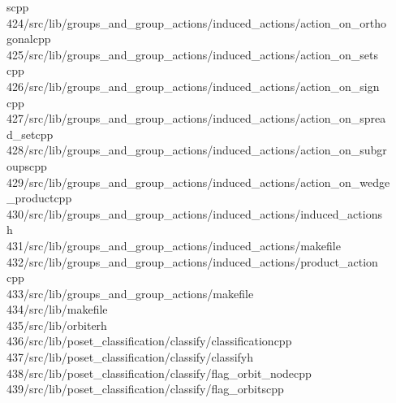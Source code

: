 \begin{tabbing}
\>scpp\\[0pt]
424\>/src/lib/groups\_and\_group\_actions/induced\_actions/action\_on\_ortho\\[0pt]
\>gonalcpp\\[0pt]
425\>/src/lib/groups\_and\_group\_actions/induced\_actions/action\_on\_sets\\[0pt]
\>cpp\\[0pt]
426\>/src/lib/groups\_and\_group\_actions/induced\_actions/action\_on\_sign\\[0pt]
\>cpp\\[0pt]
427\>/src/lib/groups\_and\_group\_actions/induced\_actions/action\_on\_sprea\\[0pt]
\>d\_setcpp\\[0pt]
428\>/src/lib/groups\_and\_group\_actions/induced\_actions/action\_on\_subgr\\[0pt]
\>oupscpp\\[0pt]
429\>/src/lib/groups\_and\_group\_actions/induced\_actions/action\_on\_wedge\\[0pt]
\>\_productcpp\\[0pt]
430\>/src/lib/groups\_and\_group\_actions/induced\_actions/induced\_actions\\[0pt]
\>h\\[0pt]
431\>/src/lib/groups\_and\_group\_actions/induced\_actions/makefile\\[0pt]
432\>/src/lib/groups\_and\_group\_actions/induced\_actions/product\_action\\[0pt]
\>cpp\\[0pt]
433\>/src/lib/groups\_and\_group\_actions/makefile\\[0pt]
434\>/src/lib/makefile\\[0pt]
435\>/src/lib/orbiterh\\[0pt]
436\>/src/lib/poset\_classification/classify/classificationcpp\\[0pt]
437\>/src/lib/poset\_classification/classify/classifyh\\[0pt]
438\>/src/lib/poset\_classification/classify/flag\_orbit\_nodecpp\\[0pt]
439\>/src/lib/poset\_classification/classify/flag\_orbitscpp\\[0pt]

\end{tabbing}
